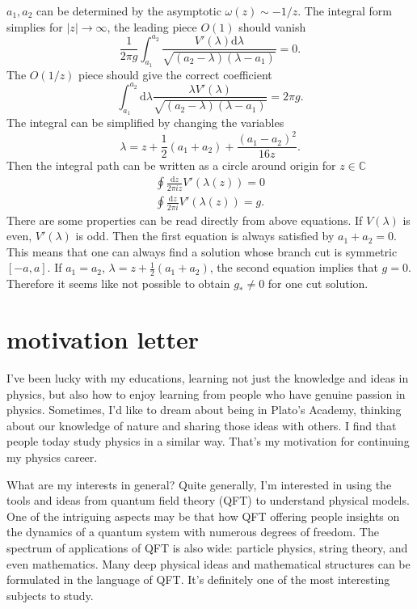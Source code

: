 $a_1,a_2$ can be determined by the asymptotic $\omega(z)\sim - 1/z$.
The integral form simplies for $|z|\to\infty$, the leading piece $O(1)$ should vanish
\[
	\frac{1}{2\pi g} \int_{a_1}^{a_2} \frac{V'(\lambda)\mathrm{d}\lambda}{\sqrt{(a_2-\lambda)(\lambda-a_1)}} = 0
.\]
The $O(1/z)$ piece should give the correct coefficient
\[
	\int_{a_1}^{a_2} \mathrm{d}\lambda \frac{\lambda V'(\lambda)}{\sqrt{(a_2-\lambda)(\lambda-a_1)}} = 2\pi g
.\]
The integral can be simplified by changing the variables
\[
	\lambda = z + \frac{1}{2} (a_1 + a_2) + \frac{(a_1-a_2)^2}{16 z}
.\]
Then the integral path can be written as a circle around origin for $z\in\mathbb{C}$
\begin{align}
	\oint \frac{\mathrm{d}z}{2\pi i z} V'(\lambda(z)) = 0 \\
	\oint \frac{\mathrm{d}z}{2\pi i} V'(\lambda(z)) = g
.\end{align}
There are some properties can be read directly from above equations.
If $V(\lambda)$ is even, $V'(\lambda)$ is odd.
Then the first equation is always satisfied by $a_1+a_2=0$.
This means that one can always find a solution whose branch cut is symmetric $[-a,a]$.
If $a_1 = a_2$,  $\lambda = z + \frac{1}{2}(a_1 + a_2)$,
the second equation implies that $g=0$.
Therefore it seems like not possible to obtain $g_*\neq 0$ for one cut solution.

\section{motivation letter}

I've been lucky with my educations, 
learning not just the knowledge and ideas in physics, 
but also how to enjoy learning from people who have genuine passion in physics.
Sometimes, I'd like to dream about being in Plato's Academy, 
thinking about our knowledge of nature and sharing those ideas with others.
I find that people today study physics in a similar way. 
That's my motivation for continuing my physics career.

What are my interests in general? 
Quite generally, I'm interested in using the tools and ideas from quantum field theory (QFT) to understand physical models. 
One of the intriguing aspects may be that how QFT offering people insights on the dynamics of a quantum system with numerous degrees of freedom. 
The spectrum of applications of QFT is also wide: particle physics, string theory, and even mathematics. 
Many deep physical ideas and mathematical structures can be formulated in the language of QFT. 
It's definitely one of the most interesting subjects to study.
 
